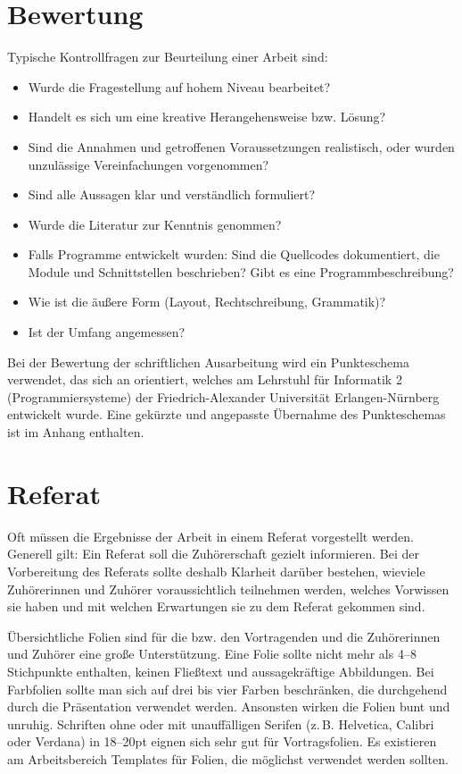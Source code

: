 \documentclass[
    fontsize=12pt,
    headings=small,
    parskip=half,           %
    bibliography=totoc,
    numbers=noenddot,       %
    open=any,               %
    ]{scrreprt}
\begin{document}
\section{Bewertung}

Typische Kontrollfragen zur Beurteilung einer Arbeit sind:
\begin{itemize}
	\item Wurde die Fragestellung auf hohem Niveau bearbeitet?
	\item Handelt es sich um eine kreative Herangehensweise bzw. Lösung?
	\item Sind die Annahmen und getroffenen Voraussetzungen realistisch, oder wurden unzulässige Vereinfachungen vorgenommen?
	\item Sind alle Aussagen klar und verständlich formuliert?
	\item Wurde die Literatur zur Kenntnis genommen?
	\item Falls Programme entwickelt wurden: Sind die Quellcodes dokumentiert, die Module und Schnittstellen beschrieben? Gibt es eine Programmbeschreibung?
	\item Wie ist die äußere Form (Layout, Rechtschreibung, Grammatik)?
	\item Ist der Umfang angemessen?
\end{itemize}

Bei der Bewertung der schriftlichen Ausarbeitung wird ein Punkteschema verwendet, das sich an \cite{faui2} orientiert, welches am Lehrstuhl für Informatik 2 (Programmiersysteme) der Friedrich-Alexander Universität Erlangen-Nürnberg entwickelt wurde. Eine gekürzte und angepasste Übernahme des Punkteschemas ist im Anhang enthalten.

\section{Referat}

Oft müssen die Ergebnisse der Arbeit in einem Referat vorgestellt werden. Generell gilt: Ein Referat soll die Zuhörerschaft gezielt informieren. Bei der Vorbereitung des Referats sollte deshalb Klarheit darüber bestehen, wieviele Zuhörerinnen und Zuhörer voraussichtlich teilnehmen werden, welches Vorwissen sie haben und mit welchen Erwartungen sie zu dem Referat gekommen sind.

Übersichtliche Folien sind für die bzw. den Vortragenden und die Zuhörerinnen und Zuhörer eine große Unterstützung. Eine Folie sollte nicht mehr als 4--8 Stichpunkte enthalten, keinen Fließtext und aussagekräftige Abbildungen. Bei Farbfolien sollte man sich auf drei bis vier Farben beschränken, die durchgehend durch die Präsentation verwendet werden. Ansonsten wirken die Folien bunt und unruhig. Schriften ohne oder mit unauffälligen Serifen (z.\,B. Helvetica, Calibri oder Verdana) in 18--20pt eignen sich sehr gut für Vortragsfolien. Es existieren am Arbeitsbereich Templates für Folien, die möglichst verwendet werden sollten.
\end{document}
